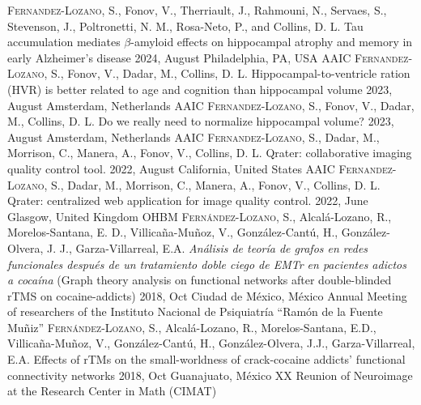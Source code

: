 {
\setlength\tabcolsep{0pt} \setlength{\extrarowheight}{0pt}%
\begin{itemize}[leftmargin=5ex, nosep, noitemsep, itemindent=-13pt,
    label=\raisebox{0.25ex}{\tiny$\bullet$}]%
    \vspace{-1.8mm}%
    \cvposter
        {{\scshape{Fernandez-Lozano, S.}}, Fonov, V., Therriault, J., Rahmouni,
        N., Servaes, S., Stevenson, J., Poltronetti, N. M., Rosa-Neto, P.,
        and Collins, D. L.}
        {Tau accumulation mediates $\beta$-amyloid effects on hippocampal atrophy
        and memory in early Alzheimer’s disease}
        {2024, August}
        {Philadelphia, PA, USA}
        {AAIC}
    \cvposter
        {{\scshape{Fernandez-Lozano, S.}}, Fonov, V., Dadar, M., Collins, D. L.}
        {Hippocampal-to-ventricle ration (HVR) is better related to age and
        cognition than hippocampal volume}
        {2023, August}
        {Amsterdam, Netherlands}
        {AAIC}
    \cvposter
        {{\scshape{Fernandez-Lozano, S.}}, Fonov, V., Dadar, M., Collins, D. L.}
        {Do we really need to normalize hippocampal volume?}
        {2023, August}
        {Amsterdam, Netherlands}
        {AAIC}
    \cvposter
        {{\scshape{Fernandez-Lozano, S.}}, Dadar, M., Morrison, C., Manera, A.,
        Fonov, V., Collins, D. L.}
        {Qrater: collaborative imaging quality control tool.}
        {2022, August}
        {California, United States}
        {AAIC}
    \cvposter
        {{\scshape{Fernandez-Lozano, S.}}, Dadar, M., Morrison, C., Manera, A.,
        Fonov, V., Collins, D. L.}
        {Qrater: centralized web application for image quality control.}
        {2022, June}
        {Glasgow, United Kingdom}
        {OHBM}
    \cvposter
        {{\scshape{Fernández-Lozano, S.}}, Alcalá-Lozano, R.,
          Morelos-Santana, E. D., Villicaña-Muñoz, V., González-Cantú, H.,
          González-Olvera, J. J., Garza-Villarreal, E.A.}
        {\textit{Análisis de teoría de grafos en redes funcionales después de un
          tratamiento doble ciego de EMTr en pacientes adictos a cocaína}
            (Graph theory analysis on functional networks after double-blinded
        rTMS on cocaine-addicts)}
        {2018, Oct}
        {Ciudad de México, México}
        {Annual Meeting of researchers of the Instituto Nacional de Psiquiatría ``Ramón de la Fuente Muñiz''}
    \cvposter
        {{\scshape{Fernández-Lozano, S.}}, Alcalá-Lozano, R.,
          Morelos-Santana, E.D., Villicaña-Muñoz, V., González-Cantú, H.,
          González-Olvera, J.J., Garza-Villarreal, E.A.}
        {Effects of rTMs on the small-worldness of crack-cocaine addicts'
        functional connectivity networks}
        {2018, Oct}
        {Guanajuato, México}
        {XX Reunion of Neuroimage at the Research Center in Math (CIMAT)}
\end{itemize}
}
